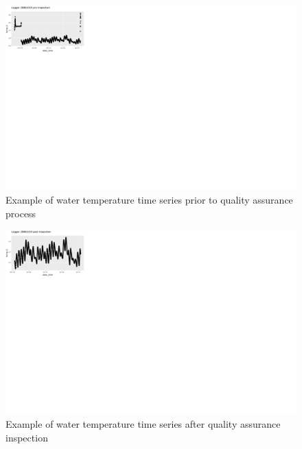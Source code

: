 \documentclass[
  letterpaper,
  DIV=11,
  numbers=noendperiod]{scrreprt}
\begin{document}
\begin{figure}

{\centering \includegraphics{./temp_logger_data_prep_files/figure-pdf/fig-preqa-1.pdf}

}

\caption{\label{fig-preqa}Example of water temperature time series prior
to quality assurance process}

\end{figure}

\begin{figure}

{\centering \includegraphics{./temp_logger_data_prep_files/figure-pdf/fig-postqa-1.pdf}

}

\caption{\label{fig-postqa}Example of water temperature time series
after quality assurance inspection}

\end{figure}
\end{document}
